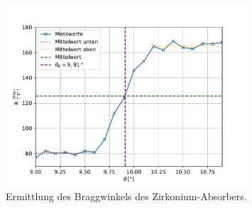 \begin{figure}[H]
  \centering
  \includegraphics[width=0.80\textwidth]{content/Plots/Zirkonium.pdf}
  \caption{Ermittlung des Braggwinkels des Zirkonium-Absorbers.}
  \label{fig:Zirkonium}
\end{figure}
